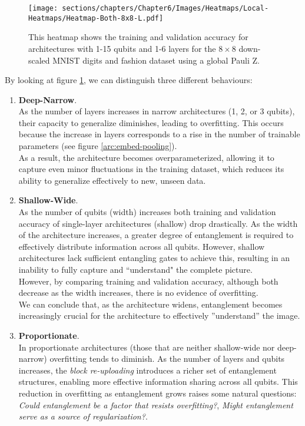 
\begin{figure}[h]
    \centering
    \texttt{[image: sections/chapters/Chapter6/Images/Heatmaps/Local-Heatmaps/Heatmap-Both-8x8-L.pdf]}
    \caption{This heatmap shows the training and validation accuracy for architectures with 1-15 qubits and
    1-6 layers for the $8\times8$ down-scaled MNIST digits and fashion dataset using a global Pauli Z.}
    \label{fig:heatmap-8x8-L}
\end{figure}
By looking at figure \ref{fig:heatmap-8x8-L}, we can distinguish 
three different behaviours:

\begin{enumerate}
    \item \textbf{Deep-Narrow}.\\
    As the number of layers increases in narrow architectures (1, 2, or 3 qubits), their capacity to 
    generalize diminishes, leading to overfitting. This occurs because the increase in layers corresponds 
    to a rise in the number of trainable parameters (see figure \ref{arc:embed-pooling}).\\
    As a result, the architecture becomes overparameterized, allowing it to capture even minor 
    fluctuations in the training dataset, which reduces its ability to generalize effectively to new, 
    unseen data.
    \item \textbf{Shallow-Wide}.\\
    As the number of qubits (width) increases both training and validation accuracy of 
    single-layer architectures (shallow) drop drastically.
    As the width of the architecture increases, a greater degree of entanglement is required to 
    effectively distribute information across all qubits. However, shallow architectures lack 
    sufficient entangling gates to achieve this, resulting in an inability to fully capture and 
    “understand" the complete picture.\\
    However, by comparing training and validation accuracy, although both decrease as 
    the width increases, there is no evidence of overfitting.\\
    We can conclude that, as the architecture widens, entanglement becomes increasingly crucial for the 
    architecture to effectively ”understand” the image.
    \item \textbf{Proportionate}.\\
    In proportionate architectures (those that are neither shallow-wide nor deep-narrow) overfitting 
    tends to diminish. As the number of layers and qubits increases, the \textit{block re-uploading} 
    introduces a richer set of entanglement structures, enabling more effective information sharing 
    across all qubits. This reduction in overfitting as entanglement grows raises some natural questions:
    \textit{Could entanglement be a factor that resists overfitting?}, 
    \textit{Might entanglement serve as a source of regularization?}.
\end{enumerate}
